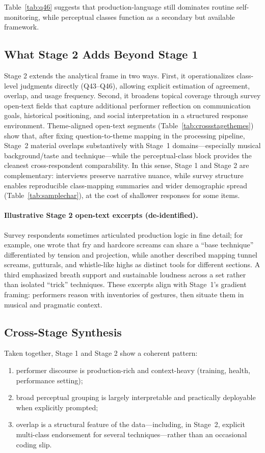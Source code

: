 \documentclass{article}
\begin{document}
Table~\ref{tab:q46} suggests that production-language still dominates routine self-monitoring, while perceptual classes function as a secondary but available framework.

\subsection{What Stage 2 Adds Beyond Stage 1}
Stage 2 extends the analytical frame in two ways.
First, it operationalizes class-level judgments directly (Q43--Q46), allowing explicit estimation of agreement, overlap, and usage frequency.
Second, it broadens topical coverage through survey open-text fields that capture additional performer reflection on communication goals, historical positioning, and social interpretation in a structured response environment.
Theme-aligned open-text segments (Table~\ref{tab:crossstagethemes}) show that, after fixing question-to-theme mapping in the processing pipeline, Stage~2 material overlaps substantively with Stage~1 domains---especially musical background/taste and technique---while the perceptual-class block provides the cleanest cross-respondent comparability.
In this sense, Stage 1 and Stage 2 are complementary: interviews preserve narrative nuance, while survey structure enables reproducible class-mapping summaries and wider demographic spread (Table~\ref{tab:samplechar}), at the cost of shallower responses for some items.

\paragraph{Illustrative Stage 2 open-text excerpts (de-identified).}
Survey respondents sometimes articulated production logic in fine detail; for example, one wrote that fry and hardcore screams can share a ``base technique'' differentiated by tension and projection, while another described mapping tunnel screams, gutturals, and whistle-like highs as distinct tools for different sections.
A third emphasized breath support and sustainable loudness across a set rather than isolated ``trick'' techniques.
These excerpts align with Stage~1's gradient framing: performers reason with inventories of gestures, then situate them in musical and pragmatic context.

\subsection{Cross-Stage Synthesis}
Taken together, Stage 1 and Stage 2 show a coherent pattern:
\begin{enumerate}
    \item performer discourse is production-rich and context-heavy (training, health, performance setting);
    \item broad perceptual grouping is largely interpretable and practically deployable when explicitly prompted;
    \item overlap is a structural feature of the data---including, in Stage~2, explicit multi-class endorsement for several techniques---rather than an occasional coding slip.
\end{enumerate}
\end{document}
